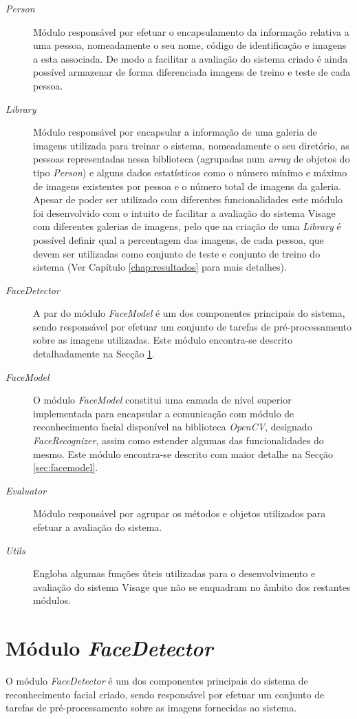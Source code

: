 \begin{description}
\item[\textit{Person}] Módulo responsável por efetuar o encapsulamento da informação relativa a uma pessoa, nomeadamente o seu nome, código de identificação e imagens a esta associada. De modo a facilitar a avaliação do sistema criado é ainda possível armazenar de forma diferenciada imagens de treino e teste de cada pessoa.
\item[\textit{Library}]Módulo responsável por encapsular a informação de uma galeria de imagens utilizada para treinar o sistema, nomeadamente o seu diretório, as pessoas representadas nessa biblioteca (agrupadas num \textit{array} de objetos do tipo \textit{Person}) e alguns dados estatísticos como o número mínimo e máximo de imagens existentes por pessoa e o número total de imagens da galeria. Apesar de poder ser utilizado com diferentes funcionalidades este módulo foi desenvolvido com o intuito de facilitar a avaliação do sistema Visage com diferentes galerias de imagens, pelo que na criação de uma \textit{Library} é possível definir qual a percentagem das imagens, de cada pessoa, que devem ser utilizadas como conjunto de teste e conjunto de treino do sistema (Ver Capítulo \ref{chap:resultados} para mais detalhes).
\item[\textit{FaceDetector}] A par do módulo \textit{FaceModel} é um dos componentes principais do sistema, sendo responsável por efetuar um conjunto de tarefas de pré-processamento sobre as imagens utilizadas. Este módulo encontra-se descrito detalhadamente na Secção \ref{sec:facedetector}.
\item[\textit{FaceModel}] 
O módulo \textit{FaceModel} constitui uma camada de nível superior implementada para encapsular a comunicação com módulo de reconhecimento facial disponível na biblioteca \textit{OpenCV}, designado \textit{FaceRecognizer}, assim como estender algumas das funcionalidades do mesmo. Este módulo encontra-se descrito com maior detalhe na Secção \ref{sec:facemodel}.
\item[\textit{Evaluator}] Módulo responsável por agrupar os métodos e objetos utilizados para efetuar a avaliação do sistema.
\item[\textit{Utils}] Engloba algumas funções úteis utilizadas para o desenvolvimento e avaliação do sistema Visage que não se enquadram no âmbito dos restantes módulos.
\end{description}

\section{Módulo \textit{FaceDetector}} \label{sec:facedetector}
O módulo \textit{FaceDetector} é um dos componentes principais do sistema de reconhecimento facial criado, sendo responsável por efetuar um conjunto de tarefas de pré-processamento sobre as imagens fornecidas ao sistema.

